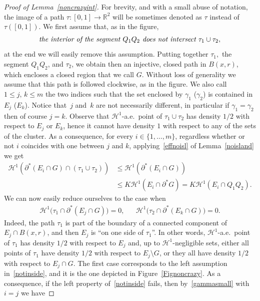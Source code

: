 \documentclass[JEP,XML,SOM,Unicode,NoFloatCountersInSection]{cedram}
\newcommand\R{\mathbb{R}}
\renewcommand\H{\mathcal{H}}
\theoremstyle{plain}
\theoremstyle{definition}
\begin{document}
\begin{proof}[Proof of Lemma~\ref{noncrazyint}]
For brevity, and with a small abuse of notation, the image of a path $\tau:[0,1]\to\R^2$ will be sometimes denoted as $\tau$ instead of $\tau([0,1])$. We first assume that, as in the figure,
\begin{equation}\label{justforasec}
\hbox{\it the interior of the segment $Q_1Q_2$ does not intersect $\tau_1\cup \tau_2$},
\end{equation}
at the end we will easily remove this assumption. Putting together $\tau_1,$ the segment $Q_1Q_2$, and $\tau_2$, we obtain then an injective, closed path in $B(x,r)$, which encloses a closed region that we call $G$. Without loss of generality we assume that this path is followed clockwise, as in the figure. We also call $1\leq j,\,k\leq m$ the two indices such that the set enclosed by $\gamma_1$ (\resp $\gamma_2$) is contained in $E_j$ (\resp $E_k$). Notice that~$j$ and~$k$ are not necessarily different, in particular if $\gamma_1=\gamma_2$ then of course $j=k$. Observe that $\H^1$-a.e.\ point of $\tau_1\cup\tau_2$ has density $1/2$ with respect to $E_j$ or $E_k$, hence it cannot have density $1$ with respect to any of the sets of the cluster. As a consequence, for every $i\in\{1,\dots,m\}$, regardless whether or not $i$ coincides with one between $j$ and $k$, applying~\eqref{effnoisl} of Lemma~\ref{noisland} we get
\begin{equation}\label{gammasmall}
\begin{split}
\H^1(\partial^* (E_i\cap G)\cap (\tau_1\cup\tau_2)) &\leq \H^1(\partial^*(E_i\cap G))\\
& \leq K \H^1(E_i\cap \partial^* G)=K \H^1(E_i\cap Q_1Q_2).
\end{split}
\end{equation}
We can now easily reduce ourselves to the case when
\begin{align}\label{notinside}
\H^1\big(\tau_1 \cap \partial^*(E_j\cap G)\big)=0, && \H^1\big(\tau_2 \cap \partial^*(E_k\cap G)\big)=0.
\end{align}
Indeed, the path $\tau_1$ is part of the boundary of a connected component of $E_j\cap B(x,r)$, and then $E_j$ is ``on one side of $\tau_1$''. In other words, $\H^1$-a.e.\ point of $\tau_1$ has density $1/2$ with respect to $E_j$ and, up to $\H^1$-negligible sets, either all points of $\tau_1$ have density $1/2$ with respect to $E_j\setminus G$, or they all have density $1/2$ with respect to $E_j\cap G$. The first case corresponds to the left assumption in~\eqref{notinside}, and it is the one depicted in Figure~\ref{Fignoncrazy}. As a consequence, if the left property of~\eqref{notinside} fails, then by~\eqref{gammasmall} with $i=j$ we have

\end{proof}
\end{document}
